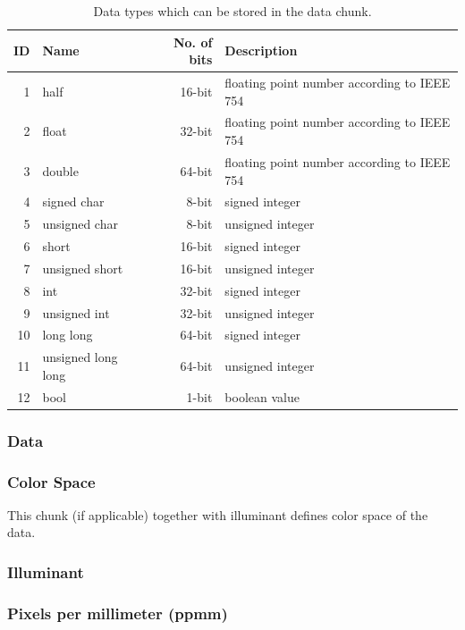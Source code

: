 \documentclass{article}
\begin{document}
\begin{table}
\caption{\label{tab:datatypes}Data types which can be stored in the data chunk.}
\begin{center}
\begin{tabular}{rlrl}
ID & Name & No. of bits & Description \\
\hline
1 & half & 16-bit & floating point number according to IEEE 754 \\
2 & float & 32-bit & floating point number according to IEEE 754 \\
3 & double & 64-bit & floating point number according to IEEE 754 \\
4 & signed char & 8-bit & signed integer \\
5 & unsigned char & 8-bit & unsigned integer \\
6 & short & 16-bit & signed integer \\
7 & unsigned short & 16-bit & unsigned integer \\
8 & int & 32-bit & signed integer \\
9 & unsigned int & 32-bit & unsigned integer \\
10 & long long & 64-bit & signed integer \\
11 & unsigned long long & 64-bit & unsigned integer \\
12 & bool & 1-bit & boolean value
\end{tabular}
\end{center}
\end{table}

\subsubsection{Data}

\subsubsection{Color Space}
This chunk (if applicable) together with illuminant defines color space of the data.

\subsubsection{Illuminant}

\subsubsection{Pixels per millimeter (ppmm)}
\end{document}
